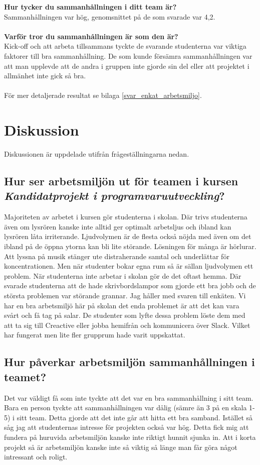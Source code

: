 \textbf{Hur tycker du sammanhållningen i ditt team är?}\\
Sammanhållningen var hög, genomsnittet på de som svarade var 4,2.\\\\
\textbf{Varför tror du sammanhållningen är som den är?}\\
Kick-off och att arbeta tillsammans tyckte de svarande studenterna var viktiga faktorer till bra sammanhållning. De som kunde försämra sammanhållningen var att man upplevde att de andra i gruppen inte gjorde sin del eller att projektet i allmänhet inte gick så bra.\\\\
För mer detaljerade resultat se bilaga \ref{svar_enkat_arbetsmiljo}.

\section{Diskussion}
\label{sec:discussion-hampus}
Diskussionen är uppdelade utifrån frågeställningarna nedan.

\subsection{Hur ser arbetsmiljön ut för teamen i kursen \textit{Kandidatprojekt i programvaruutveckling}?}
Majoriteten av arbetet i kursen gör studenterna i skolan. Där trivs studenterna även om lysrören kanske inte alltid ger optimalt arbetsljus och ibland kan lysrören låta irriterande. Ljudvolymen är de flesta också nöjda med även om det ibland på de öppna ytorna kan bli lite störande. Lösningen för många är hörlurar. Att lyssna på musik stänger ute distraherande samtal och underlättar för koncentrationen. Men när studenter bokar egna rum så är sällan ljudvolymen ett problem. När studenterna inte arbetar i skolan gör de det oftast hemma. Där svarade studenterna att de hade skrivbordslampor som gjorde ett bra jobb och de största problemen var störande grannar. Jag håller med svaren till enkäten. Vi har en bra arbetsmiljö här på skolan det enda problemet är att det kan vara svårt och få tag på salar. De studenter som lyfte dessa problem löste dem med att ta sig till Creactive eller jobba hemifrån och kommunicera över Slack. Vilket har fungerat men lite fler grupprum hade varit uppskattat. 

\subsection{Hur påverkar arbetsmiljön sammanhållningen i teamet?}
Det var väldigt få som inte tyckte att det var en bra sammanhållning i sitt team. Bara en person tyckte att sammanhållningen var dålig (sämre än 3 på en skala 1-5) i sitt team. Detta gjorde att det inte går att hitta ett bra samband. Istället så såg jag att studenternas intresse för projekten också var hög. Detta fick mig att fundera på huruvida arbetsmiljön kanske inte riktigt hunnit sjunka in. Att i korta projekt så är arbetsmiljön kanske inte så viktig så länge man får göra något intressant och roligt.

